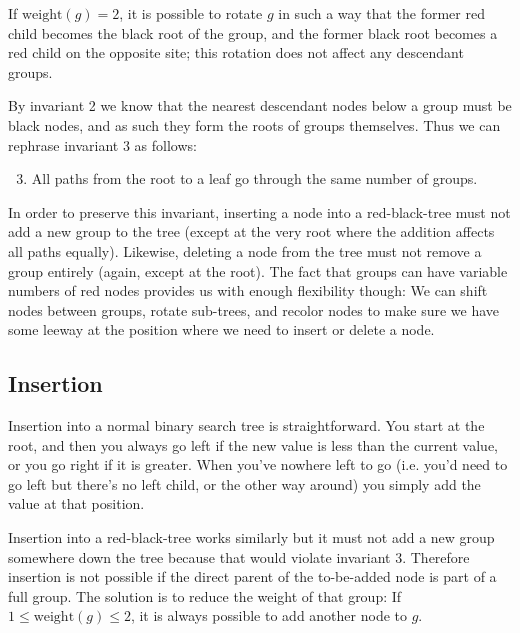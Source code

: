 \documentclass{article}
\begin{document}
If \(\text{weight}(g) = 2\), it is possible to rotate \(g\) in such a way that the
former red child becomes the black root of the group, and the former black root becomes
a red child on the opposite site; this rotation does not affect any descendant groups.

By invariant 2 we know that the nearest descendant nodes below a group must be black
nodes, and as such they form the roots of groups themselves.  Thus we can rephrase
invariant 3 as follows:

\begin{enumerate}[label=(\arabic*)]
\setcounter{enumi}{2}
\item All paths from the root to a leaf go through the same number of groups.
\end{enumerate}

In order to preserve this invariant, inserting a node into a red-black-tree must not add
a new group to the tree (except at the very root where the addition affects all paths
equally). Likewise, deleting a node from the tree must not remove a group entirely
(again, except at the root). The fact that groups can have variable numbers of red nodes
provides us with enough flexibility though: We can shift nodes between groups, rotate
sub-trees, and recolor nodes to make sure we have some leeway at the position where we
need to insert or delete a node.

\subsection{Insertion}
Insertion into a normal binary search tree is straightforward. You start at the root,
and then you always go left if the new value is less than the current value, or you go
right if it is greater. When you've nowhere left to go (i.e. you'd need to go left but
there's no left child, or the other way around) you simply add the value at that
position.

Insertion into a red-black-tree works similarly but it must not add a new group
somewhere down the tree because that would violate invariant 3. Therefore insertion is
not possible if the direct parent of the to-be-added node is part of a full group. The
solution is to reduce the weight of that group: If \(1 \leq \text{weight}(g) \leq 2\), it is
always possible to add another node to \(g\).
\end{document}

